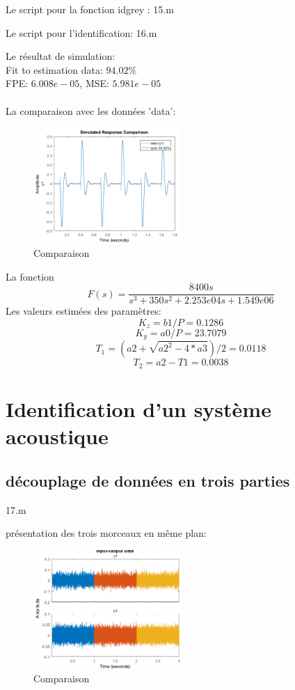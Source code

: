 \documentclass[twoside,twocolumn]{article}
\begin{document}
Le script pour la fonction idgrey :
\label{matlab}
 {15.m}

Le script pour l'identification:
\label{matlab}
 {16.m}

Le résultat de simulation:\\

Fit to estimation data: $94.02\%$ \\             
FPE: $6.008e-05$, MSE: $5.981e-05$\\\\


La comparaison avec les données 'data':

\begin{figure}[H]
\centering
\includegraphics[width=0.5\textwidth]{Images/17.png}
\caption{Comparaison}
\end{figure}

La fonction 
$$F(s)=\frac{8400 s}{s^3 + 350 s^2 + 2.253e04 s + 1.549e06} $$
Les valeurs estimées des paramètres:
$$K_z = b1 / P = 0.1286$$
$$K_y = a0/P =23.7079 $$
$$T_1 = (a2+\sqrt{a2^2-4*a3})/2 =0.0118$$
$$T_2 = a2-T1 =  0.0038$$


\section{Identification d'un système acoustique}


\subsection{découplage de données en trois parties}

\label{matlab}
 {17.m}

présentation des trois morceaux en même plan:

\begin{figure}[H]
\centering
\includegraphics[width=0.5\textwidth]{Images/18.png}
\caption{Comparaison}
\end{figure}
\end{document}
